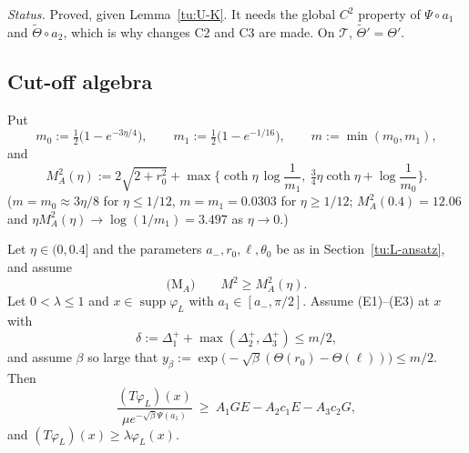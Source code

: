 \noindent\emph{Status.} Proved, given Lemma~\ref{tu:U-K}. It needs the global $C^2$ property of $\Psi\circ a_1$
and $\tilde\Theta\circ a_2$, which is why changes C2 and C3 are made. On $\mathcal T$, $\tilde\Theta'=\Theta'$.

\subsection{Cut-off algebra}

Put
\[
m_0:=\tfrac12\big(1-e^{-3\eta/4}\big),\qquad m_1:=\tfrac12\big(1-e^{-1/16}\big),\qquad m:=\min(m_0,m_1),
\]
and
\[
M_A^2(\eta):=2\sqrt{2+r_0^2}+\max\Big\{\coth\eta\,\log\frac1{m_1},\ \tfrac34\eta\coth\eta+\log\frac1{m_0}\Big\}.
\]
($m=m_0\approx3\eta/8$ for $\eta\le1/12$, $m=m_1=0.0303$ for $\eta\ge1/12$; $M_A^2(0.4)=12.06$ and
$\eta M_A^2(\eta)\to\log(1/m_1)=3.497$ as $\eta\to0$.)

\begin{lemma}[S4-alg]\label{tu:L-S4}
Let $\eta\in(0,0.4]$ and the parameters $a_-,r_0,\ell,\theta_0$ be as in Section~\ref{tu:L-ansatz}, and assume
\[
\text{(M$_A$)}\qquad M^2\ge M_A^2(\eta).
\]
Let $0<\lambda\le1$ and $x\in\operatorname{supp}\varphi_L$ with $a_1\in[a_-,\pi/2]$. Assume (E1)--(E3) at $x$ with
\[
\delta:=\Delta_1^++\max(\Delta_2^+,\Delta_3^+)\le m/2,
\]
and assume $\beta$ so large that $y_\beta:=\exp\big(-\sqrt\beta(\Theta(r_0)-\Theta(\ell))\big)\le m/2$. Then
\begin{equation}\label{tu:L-cutoff}
\frac{(T\varphi_L)(x)}{\mu e^{-\sqrt\beta\Psi(a_1)}}\ \ge\ A_1GE-A_2c_1E-A_3c_2G,
\end{equation}
and $(T\varphi_L)(x)\ge\lambda\varphi_L(x)$.
\end{lemma}

